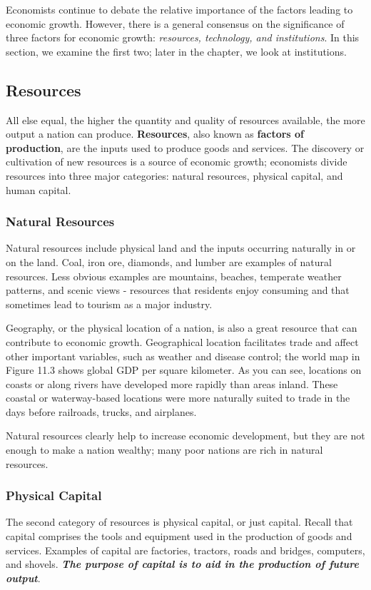 \documentclass[11pt]{article} %
\begin{document}
Economists continue to debate the relative importance of the factors leading to economic growth. However, there is a general consensus on the significance of three factors for economic growth: \textit{resources, technology, and institutions}. In this section, we examine the first two; later in the chapter, we look at institutions.

\subsection*{Resources}
All else equal, the higher the quantity and quality of resources available, the more output a nation can produce. \textbf{Resources}, also known as \textbf{factors of production}, are the inputs used to produce goods and services. The discovery or cultivation of new resources is a source of economic growth; economists divide resources into three major categories: natural resources, physical capital, and human capital.

\subsubsection*{Natural Resources}
Natural resources include physical land and the inputs occurring naturally in or on the land. Coal, iron ore, diamonds, and lumber are examples of natural resources. Less obvious examples are mountains, beaches, temperate weather patterns, and scenic views - resources that residents enjoy consuming and that sometimes lead to tourism as a major industry.

Geography, or the physical location of a nation, is also a great resource that can contribute to economic growth. Geographical location facilitates trade and affect other important variables, such as weather and disease control; the world map in Figure 11.3 shows global GDP per square kilometer. As you can see, locations on coasts or along rivers have developed more rapidly than areas inland. These coastal or waterway-based locations were more naturally suited to trade in the days before railroads, trucks, and airplanes.

Natural resources clearly help to increase economic development, but they are not enough to make a nation wealthy; many poor nations are rich in natural resources.

\subsubsection*{Physical Capital}
The second category of resources is physical capital, or just capital. Recall that capital comprises the tools and equipment used in the production of goods and services. Examples of capital are factories, tractors, roads and bridges, computers, and shovels. \textbf{\textit{The purpose of capital is to aid in the production of future output}}.
\end{document}
